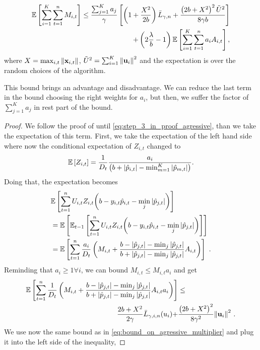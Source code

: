 {\begin{theorem}
\begin{displaymath}
\begin{split}
\mathbb{E}\left[ \sum_{i=1}^{K}\sum_{t=1}^{n}{M_{i,t}} \right]
\le\frac{\sum_{j=1}^Ka_{j}}{\gamma}\left[{\left(1+\frac{X^2}{2b} \right){\bar L}_{\gamma,n}+
\frac{\left({2b+X^2}\right)^2\tilde{U}^2}{8{\gamma}b}}\right]\\ 
+
\left({2\frac{\lambda}{b}-1}\right)\mathbb{E}\left[{\sum_{i=1}^{K}\sum_{t=1}^{n}{a_{i}A_{i,t}}}\right],
\label{bound_FO_SHAMPO_prior}
\end{split}
\end{displaymath}
 where $X=\max_{i,t}\Vert\mathbf{x}_{i,t}\Vert$,
$\tilde{U}^2=\sum_{i=1}^{K}\left\Vert {\mathbf{u}_{i}} \right\Vert^2$ and the expectation is over the
random choices of the algorithm.
\end{theorem} \label{thm:FO_bound_aggressive}
This bound brings an advantage and disadvantage. We can reduce the last term in the bound choosing the right weights for $a_i$, but then, we suffer the factor of $\sum_{j=1}^Ka_{j}$ in rest part of the bound. 
\\
\begin{proof}
We follow the proof of  until \eqref{eq:step_3_in_proof_agressive}, 
than we take the expectation of this term. First, we take the expectation of the left hand side 
where now the conditional expectation of $Z_{i,t}$ changed to 
\[
\mathbb{E}\left[{Z_{i,t}}\right]=\frac{1}{D_{t}}\frac{a_{i}}{\left({b+\left\vert{\hat{p}_{i,t}}\right\vert-\min_{m=1}^K\left\vert{\hat{p}_{m,t}}\right\vert}\right)}.
\]
Doing that, the expectation becomes
\begin{align*}
\begin{split}
&\mathbb{E}\left[{\sum_{t=1}^{n}U_{i,t}Z_{i,t}{\left({b-y_{i,t}\hat{p}_{i,t}-\min_{j}{\left\vert{ \hat{p}_{j,t}}\right\vert}}\right)}}\right] \\
        &=\mathbb{E}\left[{\mathbb{E}_{t-1}\left[{{\sum_{t=1}^{n}{U_{i,t}Z_{i,t}{\left(b-y_{i,t}\hat{p}_{i,t}-\min_{j}{\left\vert{\hat{p}_{j,t}}\right\vert}\right)}}}}\right]}\right] \\
&=\mathbb{E}\left[{\sum_{t=1}^{n}{\frac{a_{i}}{D_{t}}\left({M_{i,t}+\frac{b-\left\vert{\hat{p}_{j,t}}\right\vert-\min_{j}{\left\vert{\hat{p}_{j,t}}\right\vert }}{b+\left\vert{\hat{p}_{j,t}}\right\vert-\min_{j}{\left\vert{\hat{p}_{j,t}}\right\vert}}A_{i,t} }\right)}}\right]~.
\end{split}
\end{align*}
Reminding that $a_{i} \ge 1 \forall i$, we can bound $M_{i,t} \le M_{i,t}a_{i}$ and get 
\begin{equation}
\begin{split}
\mathbb{E}\left[ \sum_{t=1}^{n}{\frac{1}{D_{t}}}\left({M_{i,t}+\frac{b-\left\vert{\hat{p}_{j,t}}\right\vert-\min_{j}{\left\vert{\hat{p}_{j,t}}\right\vert }}{b+\left\vert{\hat{p}_{j,t}}\right\vert-\min_{j}{\left\vert{\hat{p}_{j,t}}\right\vert}}A_{i,t}a_{i} }\right) \right]
&\le \\ \frac{2b+X^2}{2\gamma}{\bar
  L}_{\gamma,i,n}(u_i)+&\frac{\left({2b+X^2}\right)^2}{8{\gamma}^2}{\left\Vert
    \mathbf{u}_{i} \right\Vert}^2~.
\label{step_3_in_proof_prior}
\end{split}
\end{equation}
We use now the same bound as in \eqref{eq:bound_on_agressive_multiplier}
and plug it into the left side of the inequality,


\end{proof}}
